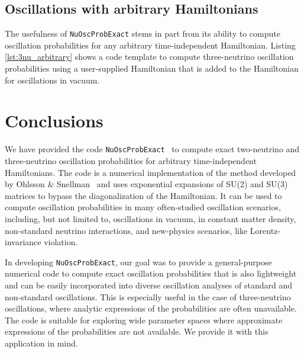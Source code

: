 \documentclass[final,5p,times,twocolumn]{elsarticle}
\begin{document}
\subsection{Oscillations with arbitrary Hamiltonians}

The usefulness of {\tt NuOscProbExact} stems in part from its ability to compute oscillation probabilities for any arbitrary time-independent Hamiltonian.   Listing \ref{lst:3nu_arbitrary} shows a code template to compute three-neutrino oscillation probabilities using a user-supplied Hamiltonian that is added to the Hamiltonian for oscillations in vacuum.




\section{Conclusions}
\label{section:conclusions}

We have provided the code {\tt NuOscProbExact}\ \cite{NuOscProbExact} to compute exact two-neutrino and three-neutrino oscillation probabilities for arbitrary time-independent Hamiltonians.  The code is a numerical implementation of the method developed by Ohlsson \& Snellman\ \cite{Barger:1980tf, Ohlsson:1999xb, Ohlsson:1999um, Ohlsson:2000zz} and uses exponential expansions of SU(2) and SU(3) matrices to bypass the diagonalization of the Hamiltonian.  It can be used to compute oscillation probabilities in many often-studied oscillation scenarios, including, but not limited to, oscillations in vacuum, in constant matter density, non-standard neutrino interactions, and new-physics scenarios, like Lorentz-invariance violation. 

In developing {\tt NuOscProbExact}, our goal was to provide a general-purpose numerical code to compute exact oscillation probabilities that is also lightweight and can be easily incorporated into diverse oscillation analyses of standard and non-standard oscillations.  This is especially useful in the case of three-neutrino oscillations, where analytic expressions of the probabilities are often unavailable.  The code is suitable for exploring wide parameter spaces where approximate expressions of the probabilities are not available.  We provide it with this application in mind.


\end{document}
